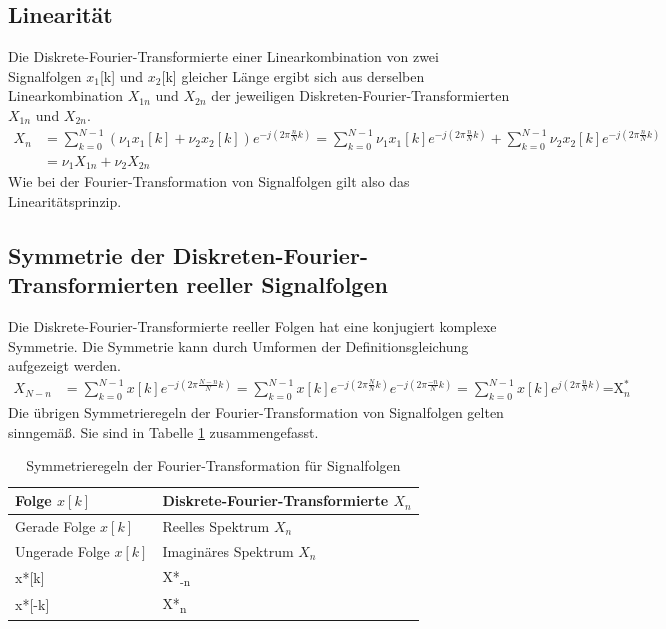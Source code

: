 \subsection{Linearität}\label{sec:linearituxe4t-4}

Die Diskrete-Fourier-Transformierte einer Linearkombination von zwei Signalfolgen \(x_{1}\){[}k{]} und \(x_{2}\){[}k{]} gleicher Länge ergibt sich aus derselben Linearkombination \(X_{1n}\) und \(X_{2n}\) der jeweiligen Diskreten-Fourier-Transformierten \(X_{1n}\) und \(X_{2n}\).
\begin{align}
{X_{n} } &=  {\sum\limits _{k=0}^{N-1}\left(\nu _{1}  x_{1} \left[k\right]+\nu _{2}  x_{2} \left[k\right]\right) e^{-j \left(2 \pi  \frac{n}{N}  k\right)}  =\sum\limits _{k=0}^{N-1}\nu _{1}  x_{1} \left[k\right] e^{-j \left(2 \pi  \frac{n}{N}  k\right)}  +\sum\limits _{k=0}^{N-1}\nu _{2}  x_{2} \left[k\right] e^{-j \left(2 \pi  \frac{n}{N}  k\right)}  } \\
{} &=  {\nu _{1}  X_{1n} +\nu _{2}  X_{2n} }
\label{eq:10.39}
\end{align}
Wie bei der Fourier-Transformation von Signalfolgen gilt also das Linearitätsprinzip.

\subsection{Symmetrie der Diskreten-Fourier-Transformierten reeller Signalfolgen}\label{sec:10.2.2}

Die Diskrete-Fourier-Transformierte reeller Folgen hat eine konjugiert komplexe Symmetrie. Die Symmetrie kann durch Umformen der Definitionsgleichung aufgezeigt werden.
\begin{align}
X_{N - n} &= \sum\limits_{k = 0}^{N - 1}{x[ k]  e^{- j  \left( 2  \pi  \frac{N - n}{N}  k \right)}} = \sum\limits_{k = 0}^{N - 1}{x[ k]  e^{- j  \left( 2  \pi  \frac{N}{N}  k \right)}  e^{- j  \left( 2  \pi  \frac{- n}{N}  k \right)}} = \sum\limits_{k = 0}^{N - 1}{x[ k]  e^{j  \left( 2  \pi  \frac{n}{N}  k \right)}}\text{=}\text{X}_{n}^{*}\ \label{eq:10.40}
\end{align}
Die übrigen Symmetrieregeln der Fourier-Transformation von Signalfolgen gelten sinngemäß. Sie sind in Tabelle \ref{tab:10.3} zusammengefasst.

\begin{table}
  \centering
  \caption{Symmetrieregeln der Fourier-Transformation für Signalfolgen}
  \label{tab:10.3}
  \begin{tabular}{ll}
    \toprule
    Folge \(x[k]\) & Diskrete-Fourier-Transformierte \(X_{n}\) \\
    \midrule
    Gerade Folge \(x[k]\) & Reelles Spektrum \(X_{n}\) \\
    Ungerade Folge \(x[k]\) & Imaginäres Spektrum \(X_{n}\) \\
    x*{[}k{]} & X*\textsubscript{-n} \\
    x*{[}-k{]} & X*\textsubscript{n} \\
    \bottomrule
  \end{tabular}
\end{table}


